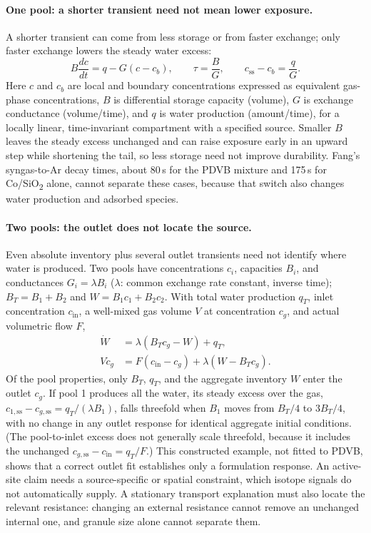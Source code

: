 \paragraph{One pool: a shorter transient need not mean lower exposure.} A shorter transient can come from less storage or from faster exchange; only faster exchange lowers the steady water excess:
\begin{equation}
 B\frac{dc}{dt}=q-G(c-c_b),\qquad
 \tau=\frac{B}{G},\qquad c_{\mathrm{ss}}-c_b=\frac{q}{G}.
 \label{eq:water-pool}
\end{equation}
Here $c$ and $c_b$ are local and boundary concentrations expressed as equivalent gas-phase concentrations, $B$ is differential storage capacity (volume), $G$ is exchange conductance (volume/time), and $q$ is water production (amount/time), for a locally linear, time-invariant compartment with a specified source. Smaller $B$ leaves the steady excess unchanged and can raise exposure early in an upward step while shortening the tail, so less storage need not improve durability. Fang's syngas-to-Ar decay times, about 80\,s for the PDVB mixture and 175\,s for Co/SiO\textsubscript{2} alone, cannot separate these cases, because that switch also changes water production and adsorbed species.\cite[Fig.~3d]{fang2026}

\paragraph{Two pools: the outlet does not locate the source.} Even absolute inventory plus several outlet transients need not identify where water is produced. Two pools have concentrations $c_i$, capacities $B_i$, and conductances $G_i=\lambda B_i$ ($\lambda$: common exchange rate constant, inverse time); $B_T=B_1+B_2$ and $W=B_1c_1+B_2c_2$. With total water production $q_T$, inlet concentration $c_{\mathrm{in}}$, a well-mixed gas volume $V$ at concentration $c_g$, and actual volumetric flow $F$,
\begin{align}
 \dot W&=\lambda(B_Tc_g-W)+q_T,\\
 V\dot c_g&=F(c_{\mathrm{in}}-c_g)+\lambda(W-B_Tc_g).
 \label{eq:water-two-pool}
\end{align}
Of the pool properties, only $B_T$, $q_T$, and the aggregate inventory $W$ enter the outlet $c_g$. If pool 1 produces all the water, its steady excess over the gas, $c_{1,\mathrm{ss}}-c_{g,\mathrm{ss}}=q_T/(\lambda B_1)$, falls threefold when $B_1$ moves from $B_T/4$ to $3B_T/4$, with no change in any outlet response for identical aggregate initial conditions. (The pool-to-inlet excess does not generally scale threefold, because it includes the unchanged $c_{g,\mathrm{ss}}-c_{\mathrm{in}}=q_T/F$.) This constructed example, not fitted to PDVB, shows that a correct outlet fit establishes only a formulation response. An active-site claim needs a source-specific or spatial constraint, which isotope signals do not automatically supply. A stationary transport explanation must also locate the relevant resistance: changing an external resistance cannot remove an unchanged internal one, and granule size alone cannot separate them.

